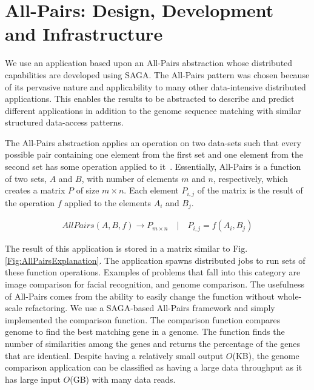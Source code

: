 \documentclass{rspublic}
\begin{document}
\vspace{-0.5cm}

\section{All-Pairs: Design, Development and Infrastructure} We use an
application based upon an All-Pairs abstraction whose distributed
capabilities are developed using SAGA. The All-Pairs pattern was
chosen because of its pervasive nature and applicability to many other
data-intensive distributed applications. This enables the results to
be abstracted to describe and predict different applications in
addition to the genome sequence matching with similar structured
data-access patterns.

The All-Pairs abstraction applies an operation on two data-sets such
that every possible pair containing one element from the first set and
one element from the second set has some operation applied to
it~\citep{AllPairs}. Essentially, All-Pairs is a function of two sets,
$A$ and $B$, with number of elements $m$ and $n$, respectively, which
creates a matrix $P$ of size $m \times n$. Each element $P_{i,j}$ of the matrix
is the result of the
operation $f$ applied to the elements $A_i$ and $B_j$.

\vspace{-0.2cm}

\begin{eqnarray}
 AllPairs(A, B, f) \rightarrow P_{m \times n} \quad | \quad P_{i,j} = f(A_{i},B_{j})
 \end{eqnarray}

The result of this application is stored in a matrix similar to Fig.
\ref{Fig:AllPairsExplanation}. The application spawns distributed jobs
to run sets of these function operations. Examples of problems that fall
into this category are image comparison for facial recognition, and
genome comparison. The usefulness of All-Pairs comes from the ability
to easily change the function without whole-scale refactoring.  We use a
SAGA-based All-Pairs framework and simply implemented the comparison
function. The comparison function compares genome to find the best
matching gene in a genome. The function finds the number of similarities
among the genes and returns the percentage of the genes that are
identical. Despite having a relatively small output $O$(KB), the genome
comparison application can be classified as having a large data
throughput as it has large input $O$(GB) with many data reads.
\end{document}
